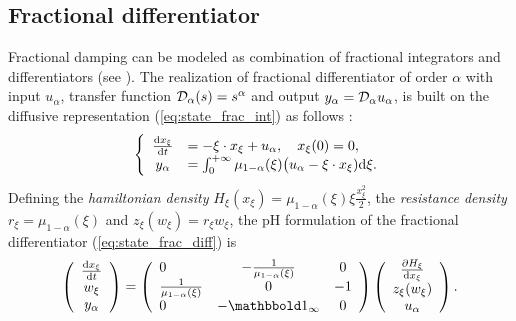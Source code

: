 \documentclass[10pt,a4paper]{article}
\begin{document}
{\subsection{Fractional differentiator}
\label{sec:frac_diff}
Fractional damping can be modeled as combination of fractional integrators and differentiators (see \cite{koeller1984applications,helie2006diffusive,sabatier2007advances,le2012diffusive}).
%
The realization of fractional differentiator of order $\alpha$ with input $u_\alpha$, transfer function ${\mathcal{D}}_\alpha(s)=s^{\alpha}$ and output $y_\alpha={\mathcal{D}}_\alpha u_\alpha$, is built on the diffusive representation (\ref{eq:state_frac_int}) as follows \cite{helie2006diffusive, le2012diffusive}:
%
\begin{equation}
\label{eq:state_frac_diff}
\left\{ \begin{array}{cl}
\frac{\mathrm{d} x_\xi}{ \mathrm{d} t} &=  -\xi\cdot x_\xi  + u_\alpha,\quad x_\xi(0)=0,\\
y_\alpha&= \int_0^{+\infty} \mu_{1-\alpha}(\xi)\big(u_\alpha-\xi\cdot x_\xi)\mathrm{d} \xi .
\end{array} \right.
\end{equation}
%
Defining the \emph{hamiltonian density }$H_\xi(x_\xi) = \mu_{1-\alpha}(\xi) \xi \frac{x_\xi^2}{2} $, the \emph{resistance density }$r_\xi = \mu_{1-\alpha}(\xi)$ and $z_\xi( w_\xi)=r_\xi w_\xi$, the pH formulation of the fractional differentiator (\ref{eq:state_frac_diff}) is 
\begin{equation}
\label{eq:phs_frac_diff}
\left(\begin{array}{c}
\frac{\d x_\xi}{ \d t} \\
w_\xi \\
y_\alpha
\end{array}\right)
=
\left(\begin{array}{lcc}
0 & - \frac{1}{\mu_{1-\alpha}(\xi)} & 0\\
 \frac{1}{\mu_{1-\alpha}(\xi)} & 0 & -1\\
0 & -\ones_\infty & 0
\end{array}\right)
\left(\begin{array}{c}
\frac{\partial H_\xi}{\d x_\xi}\\
z_\xi( w_\xi) \\
u_\alpha
\end{array}\right).
\end{equation}
% 
%
%
%
%
%
%
%
%
%
%
%
%
%
%
%
%
%
%
%
%
%
%
}
\end{document}

